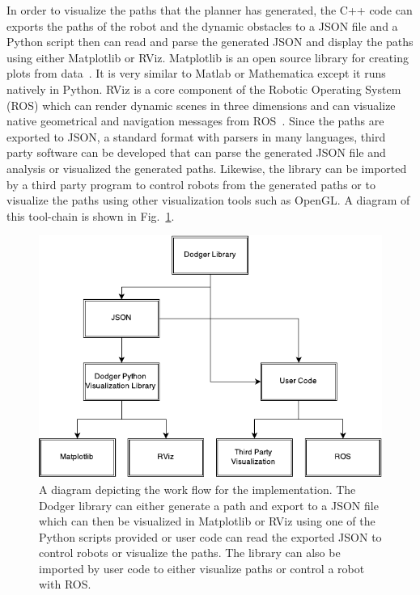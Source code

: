 In order to visualize the paths that the planner has generated, the C++ code
can exports the paths of the robot and the dynamic obstacles to a JSON file and
a Python script then can read and parse the generated JSON and display the
paths using either Matplotlib or RViz. Matplotlib is an open source library for
creating plots from data~\cite{matplotlib}. It is very similar to Matlab or
Mathematica except it runs natively in Python. RViz is a core component of the
Robotic Operating System (ROS) which can render dynamic scenes in three
dimensions and can visualize native geometrical and navigation messages from
ROS~\cite{ros}.  Since the paths are exported to JSON, a standard format with
parsers in many languages, third party software can be developed that can parse
the generated JSON file and analysis or visualized the generated paths.
Likewise, the \Name library can be imported by a third party program to control
robots from the generated paths or to visualize the paths using other
visualization tools such as OpenGL. A diagram of this tool-chain is shown in
Fig.~\ref{fig:software}.


\begin{figure}[h!]

    \centering

    \includegraphics[width=0.8\linewidth]{figs/toolchain}

    \caption{A diagram depicting the work flow for the implementation. The
    Dodger library can either generate a path and export to a JSON file which
can then be visualized in Matplotlib or RViz using one of the Python scripts
provided or user code can read the exported JSON to control robots or visualize
the paths. The library can also be imported by user code to either visualize
paths or control a robot with ROS.}

    \label{fig:software}

\end{figure}

